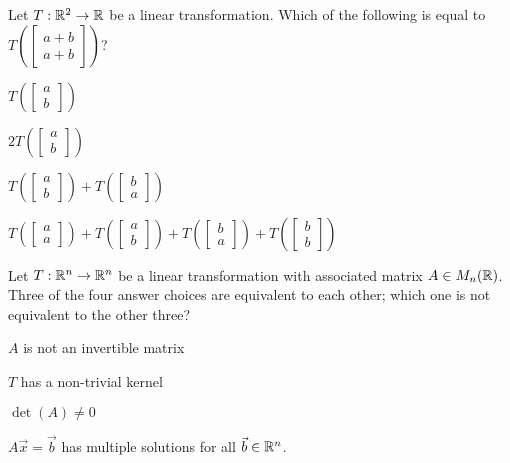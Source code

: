 \documentclass{article}
\begin{document}
\begin{readinessAssuranceTest}
\item Let $T: \mathbb{R}^2 \rightarrow \mathbb{R}$ be a linear transformation.  Which of the following is equal to $T\left(\begin{bmatrix} a+b \\ a+b \end{bmatrix}\right)$?
\begin{multicols}{2}
\begin{readinessAssuranceTestChoices}
\item $T\left(\begin{bmatrix}a \\ b \end{bmatrix} \right)$
\item $2T\left(\begin{bmatrix}a \\ b \end{bmatrix} \right)$
\item $T\left(\begin{bmatrix}a \\ b \end{bmatrix} \right)+T\left(\begin{bmatrix}b \\ a \end{bmatrix} \right)$
\item $T\left(\begin{bmatrix} a \\ a \end{bmatrix}\right)+T\left(\begin{bmatrix}a \\ b \end{bmatrix} \right)+T\left(\begin{bmatrix}b \\ a \end{bmatrix}\right)+T\left(\begin{bmatrix}b \\ b \end{bmatrix} \right)$
\end{readinessAssuranceTestChoices}
\end{multicols}

\item Let $T: \mathbb{R}^n \rightarrow \mathbb{R}^n$ be a linear transformation with associated matrix $A \in M_n(\mathbb{R})$.  Three of the four answer choices are equivalent to each other; which one is not equivalent to the other three?\begin{readinessAssuranceTestChoices}
\item $A$ is not an invertible matrix
\item $T$ has a non-trivial kernel
\item $\det(A)\neq 0$
\item $A\vec{x}=\vec{b}$ has multiple solutions for all $\vec{b} \in \mathbb{R}^n$.
\end{readinessAssuranceTestChoices}


\end{readinessAssuranceTest}
\end{document}
